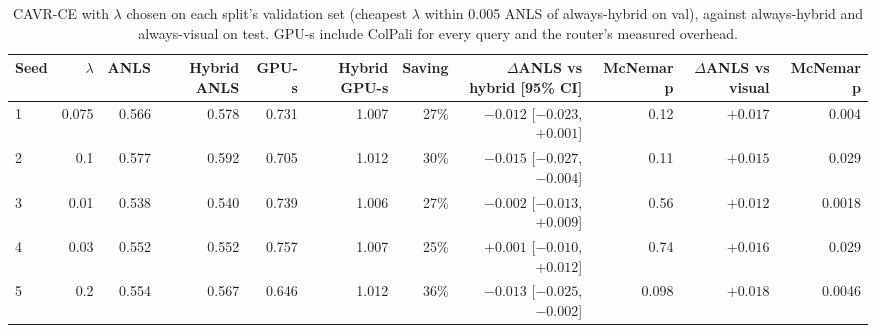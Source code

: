 \begin{table}[t]
\centering
\caption{CAVR-CE with $\lambda$ chosen on each split's validation set (cheapest $\lambda$ within 0.005 ANLS of always-hybrid on val), against always-hybrid and always-visual on test. GPU-s include ColPali for every query and the router's measured overhead.}
\label{tab:router_ce_tests}
\begin{adjustbox}{max width=\linewidth}
\begin{tabular}{lrrrrrrrrrr}
\toprule
\textbf{Seed} & \textbf{$\lambda$} & \textbf{ANLS} & \textbf{Hybrid ANLS} & \textbf{GPU-s} & \textbf{Hybrid GPU-s} & \textbf{Saving} & \textbf{$\Delta$ANLS vs hybrid [95\% CI]} & \textbf{McNemar p} & \textbf{$\Delta$ANLS vs visual} & \textbf{McNemar p} \\
\midrule
1 & 0.075 & 0.566 & 0.578 & 0.731 & 1.007 & 27\% & $-0.012$ [$-0.023$, $+0.001$] & 0.12 & $+0.017$ & 0.004 \\
2 & 0.1 & 0.577 & 0.592 & 0.705 & 1.012 & 30\% & $-0.015$ [$-0.027$, $-0.004$] & 0.11 & $+0.015$ & 0.029 \\
3 & 0.01 & 0.538 & 0.540 & 0.739 & 1.006 & 27\% & $-0.002$ [$-0.013$, $+0.009$] & 0.56 & $+0.012$ & 0.0018 \\
4 & 0.03 & 0.552 & 0.552 & 0.757 & 1.007 & 25\% & $+0.001$ [$-0.010$, $+0.012$] & 0.74 & $+0.016$ & 0.029 \\
5 & 0.2 & 0.554 & 0.567 & 0.646 & 1.012 & 36\% & $-0.013$ [$-0.025$, $-0.002$] & 0.098 & $+0.018$ & 0.0046 \\
\bottomrule
\end{tabular}
\end{adjustbox}
\end{table}

